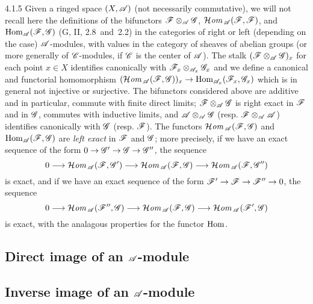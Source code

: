 \documentclass{book}
\begin{document}
\begin{env}{4.1.5}
\label{env-0.4.1.5}
Given a ringed space $(X,\mathscr{A})$ (not necessarily commutative), we will not recall here the definitions of the
bifunctors $\mathscr{F}\otimes_{\mathscr{A}}\mathscr{G}$, $\mathcal{H}\textit{om}\,_{\mathscr{A}}(\mathscr{F},\mathscr{F})$, and
${\mathop{\mathrm{Hom}}\nolimits}_{\mathscr{A}}(\mathscr{F},\mathscr{G})$ (G, II, 2.8~and~2.2) in the categories of right or left (depending on
the case) $\mathscr{A}$-modules, with values in the category of sheaves of abelian groups (or more generally
of $\mathscr{C}$-modules, if $\mathscr{C}$ is the center of $\mathscr{A}$). The stalk $(\mathscr{F}\otimes_{\mathscr{A}}\mathscr{G})_x$
for each point $x\in X$ identifies canonically with $\mathscr{F}_x\otimes_{\mathscr{A}_x}\mathscr{G}_x$ and we define a
canonical and functorial homomorphism $(\mathcal{H}\textit{om}\,_{\mathscr{A}}(\mathscr{F},\mathscr{G}))_x\to{\mathop{\mathrm{Hom}}\nolimits}_{\mathscr{A}_x}(\mathscr{F}_x,\mathscr{G}_x)$
which is in general not injective or surjective. The bifunctors considered above are additive and in particular,
commute with finite direct limits; $\mathscr{F}\otimes_{\mathscr{A}}\mathscr{G}$ is right exact in $\mathscr{F}$ and in $\mathscr{G}$,
commutes with inductive limits, and $\mathscr{A}\otimes_{\mathscr{A}}\mathscr{G}$ (resp. $\mathscr{F}\otimes_{\mathscr{A}}\mathscr{A}$)
identifies canonically with $\mathscr{G}$ (resp. $\mathscr{F}$). The functors $\mathcal{H}\textit{om}\,_{\mathscr{A}}(\mathscr{F},\mathscr{G})$ and
${\mathop{\mathrm{Hom}}\nolimits}_{\mathscr{A}}(\mathscr{F},\mathscr{G})$ are \emph{left exact} in $\mathscr{F}$ and $\mathscr{G}$; more precisely,
if we have an exact sequence of the form $0\to\mathscr{G}'\to\mathscr{G}\to\mathscr{G}''$, the sequence
\[
  0\longrightarrow\mathcal{H}\textit{om}\,_{\mathscr{A}}(\mathscr{F},\mathscr{G}')\longrightarrow
  \mathcal{H}\textit{om}\,_{\mathscr{A}}(\mathscr{F},\mathscr{G})\longrightarrow\mathcal{H}\textit{om}\,_{\mathscr{A}}(\mathscr{F},\mathscr{G}'')
\]
is exact, and if we have an exact sequence of the form $\mathscr{F}'\to\mathscr{F}\to\mathscr{F}''\to 0$, the sequence
\[
  0\longrightarrow\mathcal{H}\textit{om}\,_{\mathscr{A}}(\mathscr{F}'',\mathscr{G})\longrightarrow
  \mathcal{H}\textit{om}\,_{\mathscr{A}}(\mathscr{F},\mathscr{G})\longrightarrow\mathcal{H}\textit{om}\,_{\mathscr{A}}(\mathscr{F}',\mathscr{G})
\]
is exact, with the analagous properties for the functor ${\mathop{\mathrm{Hom}}\nolimits}$.
\end{env}

\subsection{Direct image of an $\mathscr{A}$-module}
\label{0-prelim-4.2}

\subsection{Inverse image of an $\mathscr{A}$-module}
\label{0-prelim-4.3}
\end{document}
